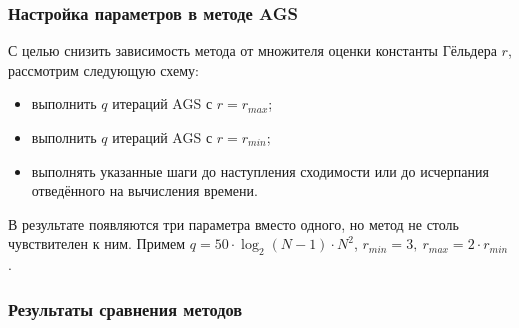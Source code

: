 \documentclass[aspectratio=1610]{beamer}
\begin{document}
\begin{frame}
  \frametitle{Настройка параметров в методе AGS}
  С целью снизить зависимость метода от множителя оценки константы Гёльдера $r$,
  рассмотрим следующую схему:
  \begin{itemize}
    \item выполнить $q$ итераций AGS с $r=r_{max}$;
    \item выполнить $q$ итераций AGS с $r=r_{min}$;
    \item выполнять указанные шаги до наступления сходимости или до исчерпания отведённого на вычисления времени.
\end{itemize}
  В результате появляются три параметра вместо одного, но метод не столь чувствителен к ним.
  Примем $q=50\cdot\log_2(N-1)\cdot N^2$, $r_{min}=3,\:r_{max}=2\cdot r_{min}$.
\end{frame}


\begin{frame}
  \frametitle{Результаты сравнения методов}
  \begin{figure}[ht]
    \centering
  \end{figure}
\end{frame}
\end{document}
